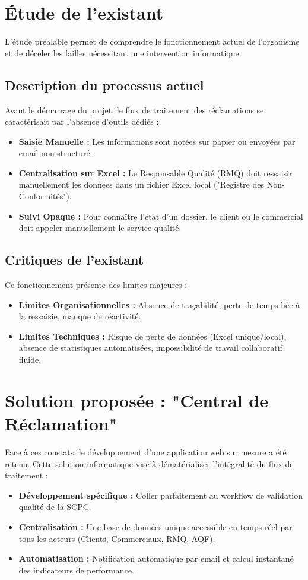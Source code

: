 \section{Étude de l'existant}
L'étude préalable permet de comprendre le fonctionnement actuel de l'organisme et de déceler les failles nécessitant une intervention informatique.

\subsection{Description du processus actuel}
Avant le démarrage du projet, le flux de traitement des réclamations se caractérisait par l'absence d'outils dédiés :
\begin{itemize}
    \item \textbf{Saisie Manuelle :} Les informations sont notées sur papier ou envoyées par email non structuré.
    \item \textbf{Centralisation sur Excel :} Le Responsable Qualité (RMQ) doit ressaisir manuellement les données dans un fichier Excel local ("Registre des Non-Conformités").
    \item \textbf{Suivi Opaque :} Pour connaître l'état d'un dossier, le client ou le commercial doit appeler manuellement le service qualité.
\end{itemize}

\subsection{Critiques de l'existant}
Ce fonctionnement présente des limites majeures :
\begin{itemize}
    \item \textbf{Limites Organisationnelles :} Absence de traçabilité, perte de temps liée à la ressaisie, manque de réactivité.
    \item \textbf{Limites Techniques :} Risque de perte de données (Excel unique/local), absence de statistiques automatisées, impossibilité de travail collaboratif fluide.
\end{itemize}

\section{Solution proposée : "Central de Réclamation"}
Face à ces constats, le développement d'une application web sur mesure a été retenu. Cette solution informatique vise à dématérialiser l'intégralité du flux de traitement :
\begin{itemize}
    \item \textbf{Développement spécifique :} Coller parfaitement au workflow de validation qualité de la SCPC.
    \item \textbf{Centralisation :} Une base de données unique accessible en temps réel par tous les acteurs (Clients, Commerciaux, RMQ, AQF).
    \item \textbf{Automatisation :} Notification automatique par email et calcul instantané des indicateurs de performance.
\end{itemize}

